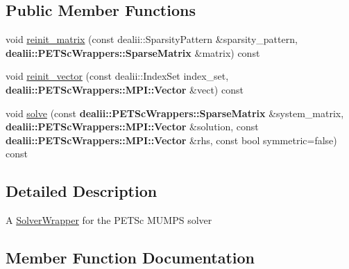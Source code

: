 \subsection*{Public Member Functions}
\begin{DoxyCompactItemize}
\item 
void \hyperlink{classincremental_f_e_1_1_solver_wrapper_p_e_t_sc_ae2476984bdcee9b2ce9934d967fa4610}{reinit\+\_\+matrix} (const dealii\+::\+Sparsity\+Pattern \&sparsity\+\_\+pattern, {\bf dealii\+::\+P\+E\+T\+Sc\+Wrappers\+::\+Sparse\+Matrix} \&matrix) const 
\item 
void \hyperlink{classincremental_f_e_1_1_solver_wrapper_p_e_t_sc_a730139be86a4ad57a06bf179efdeacc1}{reinit\+\_\+vector} (const dealii\+::\+Index\+Set index\+\_\+set, {\bf dealii\+::\+P\+E\+T\+Sc\+Wrappers\+::\+M\+P\+I\+::\+Vector} \&vect) const 
\item 
void \hyperlink{classincremental_f_e_1_1_solver_wrapper_p_e_t_sc_a711f8d4e26e941e8d9d01d4214b845cb}{solve} (const {\bf dealii\+::\+P\+E\+T\+Sc\+Wrappers\+::\+Sparse\+Matrix} \&system\+\_\+matrix, {\bf dealii\+::\+P\+E\+T\+Sc\+Wrappers\+::\+M\+P\+I\+::\+Vector} \&solution, const {\bf dealii\+::\+P\+E\+T\+Sc\+Wrappers\+::\+M\+P\+I\+::\+Vector} \&rhs, const bool symmetric=false) const 
\end{DoxyCompactItemize}


\subsection{Detailed Description}
A \hyperlink{classincremental_f_e_1_1_solver_wrapper}{Solver\+Wrapper} for the P\+E\+T\+Sc M\+U\+M\+PS solver 

\subsection{Member Function Documentation}
